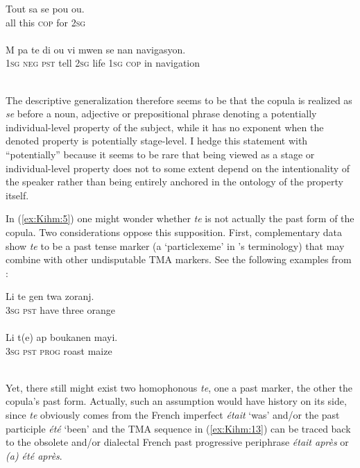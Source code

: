 \documentclass[output=paper]{langsci/langscibook}
\begin{document}
\ea\label{ex:Kihm:10} \gll Tout sa se pou ou.\\
all this \textsc{cop} for \textsc{2sg} \\
\glt {} \\

\ex\label{ex:Kihm:11} \gll M pa te di ou vi mwen se nan navigasyon.\\
\textsc{1sg} \textsc{neg} \textsc{pst} tell \textsc{2sg} life \textsc{1sg} \textsc{cop} in navigation \\
\glt {} \\
\z

The descriptive generalization therefore seems to be that the copula is
realized as \emph{se} before a noun, adjective or prepositional phrase
denoting a potentially individual-level property of the subject, while
it has no exponent when the denoted property is potentially stage-level.
I hedge this statement with ``potentially'' because it seems to be rare that being viewed as a stage or individual-level property does
not to some extent depend on the intentionality of the speaker rather
than being entirely anchored in the ontology of the property itself.

In (\ref{ex:Kihm:5}) one might wonder whether \emph{te} is not actually the past form
of the copula. Two considerations oppose this supposition. First,
complementary data show \emph{te} to be a past tense marker (a
`particlexeme' in %
\citeauthor{Zwicky90}'s \citeyear{Zwicky90} %
%
terminology) that may combine with other
undisputable TMA markers. See the following examples from %
\citet[199, 201]{Fattier2013}%
%
:


\ea\label{ex:Kihm:12} \gll Li te gen twa zoranj.\\
\textsc{3sg} \textsc{pst} have three orange \\
\glt {} \\

\ex\label{ex:Kihm:13} \gll Li t(e) ap boukanen mayi.\\
\textsc{3sg} \textsc{pst} \textsc{prog} roast maize \\
\glt {} \\
\z

Yet, there still might exist two homophonous \emph{te}, one a past
marker, the other the copula's past form. Actually, such an assumption
would have history on its side, since \emph{te} obviously comes from the
French imperfect \emph{était} `was' and/or the past participle
\emph{été} `been' and the TMA sequence in (\ref{ex:Kihm:13}) can be traced back to the
obsolete and/or dialectal French past progressive periphrase \emph{était
après} or \emph{(a) été après}.
\end{document}
